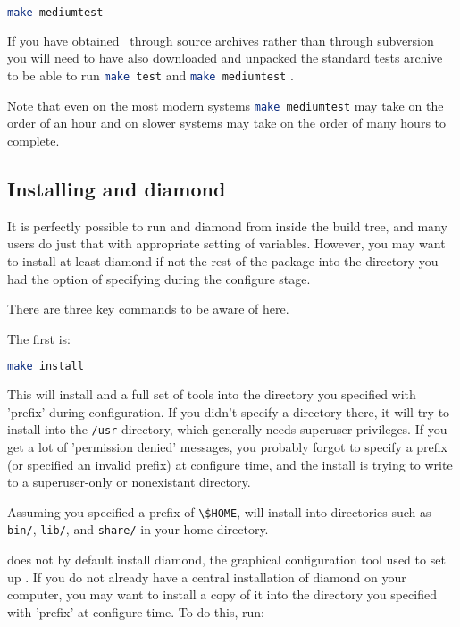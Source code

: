 \begin{lstlisting}[language=Bash]
make mediumtest
\end{lstlisting}

If you have obtained \fluidity\ through source archives rather than through
subversion you will need to have also downloaded and unpacked the standard
tests archive to be able to run \lstinline[language=Bash]+make test+ and
\lstinline[language=Bash]+make mediumtest+ .

Note that even on the most modern systems
\lstinline[language=Bash]+make mediumtest+ may take on the order of an hour and
on slower systems may take on the order of many hours to complete.

\subsection{Installing \fluidity and diamond}
\label{sec:installing_fluidity}

It is perfectly possible to run \fluidity and diamond from inside the build
tree, and many users do just that with appropriate setting of variables.
However, you may want to install at least diamond if not the rest of the
\fluidity package into the directory you had the option of specifying during
the configure stage.

There are three key commands to be aware of here.

The first is:

\begin{lstlisting}[language=Bash]
make install
\end{lstlisting}

This will install \fluidity and a full set of \fluidity tools into the
directory you specified with 'prefix' during configuration. If you didn't
specify a directory there, it will try to install into the
\lstinline[language=Bash]+/usr+ directory, which generally needs superuser
privileges. If you get a lot of 'permission denied' messages, you probably
forgot to specify a prefix (or specified an invalid prefix) at configure time,
and the install is trying to write to a superuser-only or nonexistant
directory. 

Assuming you specified a prefix of \lstinline[language=Bash]+\$HOME+, \fluidity
will install into directories such as \lstinline[language=Bash]+bin/+,
\lstinline[language=Bash]+lib/+, and \lstinline[language=Bash]+share/+ in your
home directory.

\fluidity does not by default install diamond, the graphical configuration tool
used to set up \fluidity. If you do not already have a central installation of
diamond on your computer, you may want to install a copy of it into the
directory you specified with 'prefix' at configure time. To do this, run:

